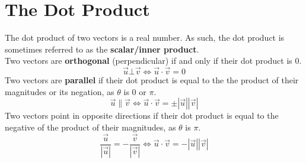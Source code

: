 \documentclass[../Calculus_\Roman{3}]{subfiles}
\begin{document}
		\section{The Dot Product}
			The dot product of two vectors is a real number. As such, the dot product is sometimes referred to as the \textbf{scalar/inner product}. \\
			Two vectors are \textbf{orthogonal} (perpendicular) if and only if their dot product is 0.
				\[\vec{u} \bot \vec{v} \iff \vec{u} \cdot \vec{v} = 0\]
			Two vectors are \textbf{parallel} if their dot product is equal to the the product of their magnitudes or its negation, as $\theta$ is 0 or $\pi$.
				\[\vec{u} \parallel \vec{v} \iff \vec{u} \cdot \vec{v} = \pm|\vec{u}||\vec{v}|\]
			Two vectors point in opposite directions if their dot product is equal to the negative of the product of their magnitudes, as $\theta$ is $\pi$.
				\[\frac{\vec{u}}{|\vec{u}|} = -\frac{\vec{v}}{|\vec{v}|} \iff \vec{u} \cdot \vec{v} = -|\vec{u}||\vec{v}|\]
\end{document}
